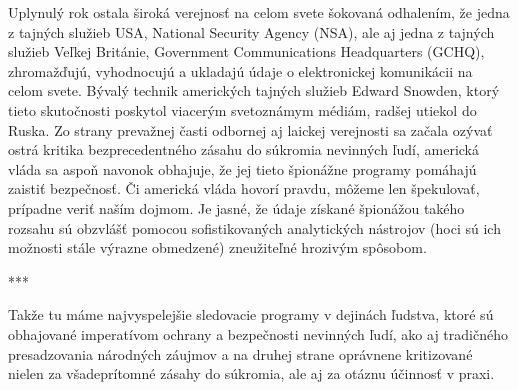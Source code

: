 \documentclass{article}
\begin{document}
\begin{flushleft}
\bigskip

\setlength{\parindent}{1,25cm}

Uplynulý rok ostala široká verejnosť na celom svete šokovaná odhalením, že jedna z tajných služieb USA, National Security Agency (NSA), ale aj jedna z tajných služieb Veľkej Británie, Government Communications Headquarters (GCHQ), zhromažďujú, vyhodnocujú a ukladajú údaje o elektronickej komunikácii na celom svete. Bývalý technik amerických tajných služieb Edward Snowden, ktorý tieto skutočnosti poskytol viacerým svetoznámym médiám, radšej utiekol do Ruska. Zo strany prevažnej časti odbornej aj laickej verejnosti sa začala ozývať ostrá kritika bezprecedentného zásahu do súkromia nevinných ľudí, americká vláda sa aspoň navonok obhajuje, že jej tieto špionážne programy pomáhajú zaistiť bezpečnosť. Či americká vláda hovorí pravdu, môžeme len špekulovať, prípadne veriť naším dojmom. Je jasné, že údaje získané špionážou takého rozsahu sú obzvlášť pomocou sofistikovaných analytických nástrojov (hoci sú ich možnosti stále výrazne obmedzené) zneužiteľné hrozivým spôsobom.\\

\begin{center}
***\\
\end{center}

Takže tu máme najvyspelejšie sledovacie programy v dejinách ľudstva, ktoré sú obhajované imperatívom ochrany a bezpečnosti nevinných ľudí, ako aj tradičného presadzovania národných záujmov a na druhej strane oprávnene kritizované nielen za všadeprítomné zásahy do súkromia, ale aj za otáznu účinnosť v praxi.\\

\smallskip


\end{flushleft}
\end{document}
